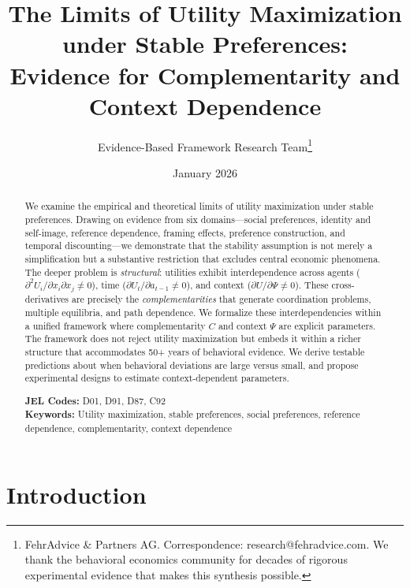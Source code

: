 \documentclass[12pt]{article}
\title{\textbf{The Limits of Utility Maximization under Stable Preferences:\\
Evidence for Complementarity and Context Dependence}}
\author{
Evidence-Based Framework Research Team\thanks{FehrAdvice \& Partners AG. Correspondence: research@fehradvice.com. We thank the behavioral economics community for decades of rigorous experimental evidence that makes this synthesis possible.}
}
\date{January 2026}
\begin{document}
\maketitle


\begin{abstract}
\noindent
We examine the empirical and theoretical limits of utility maximization under stable preferences. Drawing on evidence from six domains---social preferences, identity and self-image, reference dependence, framing effects, preference construction, and temporal discounting---we demonstrate that the stability assumption is not merely a simplification but a substantive restriction that excludes central economic phenomena. The deeper problem is \textit{structural}: utilities exhibit interdependence across agents ($\partial^2 U_i / \partial x_i \partial x_j \neq 0$), time ($\partial U_t / \partial a_{t-1} \neq 0$), and context ($\partial U / \partial \Psi \neq 0$). These cross-derivatives are precisely the \textit{complementarities} that generate coordination problems, multiple equilibria, and path dependence. We formalize these interdependencies within a unified framework where complementarity $C$ and context $\Psi$ are explicit parameters. The framework does not reject utility maximization but embeds it within a richer structure that accommodates 50+ years of behavioral evidence. We derive testable predictions about when behavioral deviations are large versus small, and propose experimental designs to estimate context-dependent parameters.

\medskip
\noindent
\textbf{JEL Codes:} D01, D91, D87, C92\\
\textbf{Keywords:} Utility maximization, stable preferences, social preferences, reference dependence, complementarity, context dependence
\end{abstract}

\newpage


\section{Introduction}
\label{sec:intro}
\end{document}
